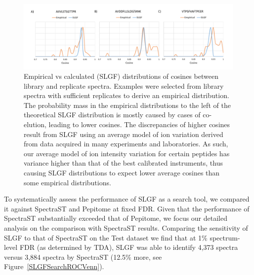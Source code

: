 \documentclass[endnotes,11pt]{article}
\begin{document}
\begin{figure}[!h]
 \centering
	\includegraphics[scale=0.42]{SLGFEmpiricals2.pdf}
	\vspace{-0.3in}
  \caption{Empirical vs calculated (SLGF) distributions of cosines between library and replicate spectra. Examples were selected from library spectra with sufficient replicates to derive an empirical distribution. The probability mass in the empirical distributions to the left of the theoretical SLGF distribution is mostly caused by cases of co-elution, leading to lower cosines. The discrepancies of higher cosines result from SLGF using an average model of ion variation derived from data acquired in many experiments and laboratories. As such, our average model of ion intensity variation for certain peptides has variance higher than that of the best calibrated instruments, thus causing SLGF distributions to expect lower average cosines than some empirical distributions. }
	\label{SLGFvsEmpirical}
\end{figure}



To systematically assess the performance of SLGF as a search tool, we compared it against SpectraST and Pepitome at fixed FDR. Given that the performance of SpectraST substantially exceeded that of Pepitome, we focus our detailed analysis on the comparison with SpectraST results. Comparing the sensitivity of SLGF to that of SpectraST on the Test dataset we find that at 1\% spectrum-level FDR (as determined by TDA), SLGF was able to identify 4,373 spectra versus 3,884 spectra by SpectraST (12.5\% more, see Figure~\ref{SLGFSearchROCVenn}).
\end{document}
